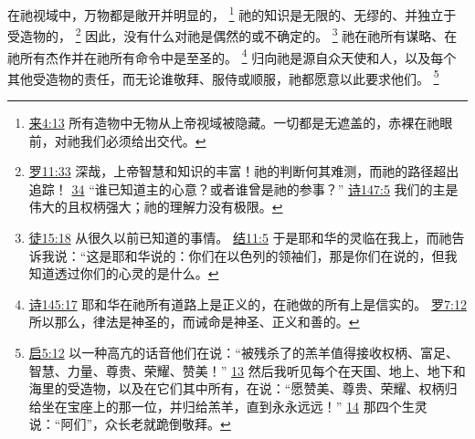 \documentclass[12pt, a4paper, oneside]{ctexart}
\begin{document}
	在祂视域中，万物都是敞开并明显的，
	\footnote {
		\href{https://biblehub.com/hebrews/4-13.htm}{来4:13} 所有造物中无物从上帝视域被隐藏。一切都是无遮盖的，赤裸在祂眼前，对祂我们必须给出交代。
	}
	祂的知识是无限的、无缪的、并独立于受造物的，
	\footnote {
		\href{https://biblehub.com/romans/11-33.htm}{罗11:33} 深哉，上帝智慧和知识的丰富！祂的判断何其难测，而祂的路径超出追踪！
		\href{https://biblehub.com/romans/11-34.htm}{34} “谁已知道主的心意？或者谁曾是祂的参事？”
		\href{https://biblehub.com/psalms/147-5.htm}{诗147:5} 我们的主是伟大的且权柄强大；祂的理解力没有极限。
	}
	因此，没有什么对祂是偶然的或不确定的。
	\footnote {
		\href{https://biblehub.com/acts/15-18.htm}{徒15:18} 从很久以前已知道的事情。
		\href{https://biblehub.com/ezekiel/11-5.htm}{结11:5} 于是耶和华的灵临在我上，而祂告诉我说：“这是耶和华说的：你们在以色列的领袖们，那是你们在说的，但我知道透过你们的心灵的是什么。
	}
	祂在祂所有谋略、在祂所有杰作并在祂所有命令中是至圣的。
	\footnote {
		\href{https://biblehub.com/psalms/145-17.htm}{诗145:17} 耶和华在祂所有道路上是正义的，在祂做的所有上是信实的。
		\href{https://biblehub.com/romans/7-12.htm}{罗7:12} 所以那么，律法是神圣的，而诫命是神圣、正义和善的。
	}
	归向祂是源自众天使和人，以及每个其他受造物的责任，而无论谁敬拜、服侍或顺服，祂都愿意以此要求他们。
	\footnote {
		\href{https://biblehub.com/revelation/5-12.htm}{启5:12} 以一种高亢的话音他们在说：“被残杀了的羔羊值得接收权柄、富足、智慧、力量、尊贵、荣耀、赞美！”
		\href{https://biblehub.com/revelation/5-13.htm}{13} 然后我听见每个在天国、地上、地下和海里的受造物，以及在它们其中所有，在说：“愿赞美、尊贵、荣耀、权柄归给坐在宝座上的那一位，并归给羔羊，直到永永远远！”
		\href{https://biblehub.com/revelation/5-14.htm}{14} 那四个生灵说：“阿们”，众长老就跪倒敬拜。
	}
	
\end{document}
